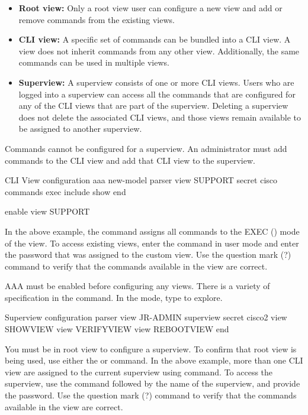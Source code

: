 \begin{itemize}
\item \textbf{Root view:} Only a root view user can configure a new view and add or remove commands from the existing views.
\item \textbf{CLI view:} A specific set of commands can be bundled into a CLI view.  A view does not inherit commands from any other view. Additionally, the same commands can be used in multiple views.
\item \textbf{Superview:} A superview consists of one or more CLI views. Users who are logged into a superview can access all the commands that are configured for any of the CLI views that are part of the superview. Deleting a superview does not delete the associated CLI views, and those views remain available to be assigned to another superview.
\end{itemize}

\note Commands cannot be configured for a superview. An administrator must add commands to the CLI view and add that CLI view to the superview.

\begin{sexylisting}{CLI View configuration}
aaa new-model
parser view SUPPORT
  secret cisco
  commands exec include show
end

enable view SUPPORT
\end{sexylisting}

In the above example, the  command assigns all  commands to the EXEC () mode of the view. To access existing views, enter the  command in user mode and enter the password that was assigned to the custom view. Use the question mark (?) command to verify that the commands available in the view are correct.

\note AAA must be enabled before configuring any views.
\note There is a variety of specification in the  command. In the  mode, type  to explore.

\begin{sexylisting}{Superview configuration}
parser view JR-ADMIN superview
  secret cisco2
  view SHOWVIEW
  view VERIFYVIEW
  view REBOOTVIEW
end
\end{sexylisting}

You must be in root view to configure a superview. To confirm that root view is being used, use either the  or  command. In the above example, more than one CLI view are assigned to the current superview using  command. To access the superview, use the  command followed by the name of the superview, and provide the password. Use the question mark (?) command to verify that the commands available in the view are correct.\\

